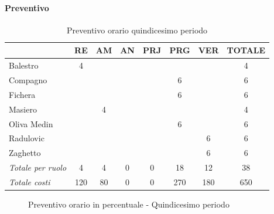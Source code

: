 \documentclass[a4paper,12pt]{article}
\begin{document}
            \paragraph{Preventivo}
                \begin{table}[H]
                \centering
                \caption{Preventivo orario quindicesimo periodo}
                \begin{tabular}{|l|c|c|c|c|c|c|c|}
                \hline
                    \rowcolor{lightgray}{\textbf{Membro}} & {\textbf{RE}} & {\textbf{AM}} & {\textbf{AN}} & {\textbf{PRJ}} & {\textbf{PRG}} & {\textbf{VER}} & {\textbf{TOTALE}}\\
                \hline
                    Balestro & 4 & & & & & & 4\\
                \hline
                    Compagno & & & & & 6 & & 6\\
                \hline
                    Fichera & & & & & 6 & & 6\\
                \hline
                    Masiero & & 4 & & & & & 4\\
                \hline
                    Oliva Medin & & & & & 6 & & 6\\
                \hline
                    Radulovic & & & & & & 6 & 6\\
                \hline
                    Zaghetto & & & & & & 6 & 6\\
                \hline
                    \rowcolor{lightgray}\textit{Totale per ruolo} & 4 & 4 & 0 & 0 & 18 & 12 & 38\\
                \hline
                    \rowcolor{lightgray}\textit{Totale costi} & 120 & 80 & 0 & 0 & 270 & 180 & 650\\
                \hline
                \end{tabular}
                \end{table}

                \begin{figure}[H]
                \centering
                \caption{Preventivo orario in percentuale - Quindicesimo periodo}
                \end{figure}
                
\end{document}
